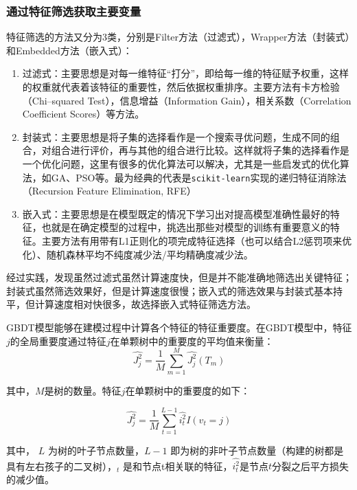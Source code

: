 \documentclass[bwprint]{gmcmthesis}
\begin{document}
\FloatBarrier
\subsubsection{通过特征筛选获取主要变量}\label{sec:feature-selection}

特征筛选的方法又分为3类，分别是Filter方法（过滤式），Wrapper方法（封装式）和Embedded方法（嵌入式）：

\begin{enumerate}
	\item 过滤式：主要思想是对每一维特征“打分”，即给每一维的特征赋予权重，这样的权重就代表着该特征的重要性，然后依据权重排序。主要方法有卡方检验（Chi--squared Test），信息增益（Information Gain），相关系数（Correlation Coefficient Scores）等方法。
	\item 封装式：主要思想是将子集的选择看作是一个搜索寻优问题，生成不同的组合，对组合进行评价，再与其他的组合进行比较。这样就将子集的选择看作是一个优化问题，这里有很多的优化算法可以解决，尤其是一些启发式的优化算法，如GA、PSO等。最为经典的代表是\texttt{scikit-learn}实现的递归特征消除法（Recursion Feature Elimination, RFE）
	\item 嵌入式：主要思想是在模型既定的情况下学习出对提高模型准确性最好的特征，也就是在确定模型的过程中，挑选出那些对模型的训练有重要意义的特征。主要方法有用带有L1正则化的项完成特征选择（也可以结合L2惩罚项来优化）、随机森林平均不纯度减少法/平均精确度减少法。
\end{enumerate}

经过实践，发现虽然过滤式虽然计算速度快，但是并不能准确地筛选出关键特征；封装式虽然筛选效果好，但是计算速度很慢；嵌入式的筛选效果与封装式基本持平，但计算速度相对快很多，故选择嵌入式特征筛选方法。


GBDT模型能够在建模过程中计算各个特征的特征重要度。在GBDT模型中，特征$j$的全局重要度通过特征$j$在单颗树中的重要度的平均值来衡量： 
\begin{equation}\label{eq:gbdt-1}
	\hat{J^2_j} = \frac{1}{M} \sum^M_{m=1}\hat{J^2_j}(T_m)
\end{equation}

其中，$M$是树的数量。特征$j$在单颗树中的重要度的如下：

\begin{equation}\label{eq:gbdt-2}
	\hat{J^2_j} = \frac{1}{M} \sum^{L-1}_{t=1}\hat{i^2_t} I (v_t=j)
\end{equation}

其中， $L$ 为树的叶子节点数量，$L−1$ 即为树的非叶子节点数量（构建的树都是具有左右孩子的二叉树），$_t$ 是和节点t相关联的特征，$\hat{i^2_t}$是节点$t$分裂之后平方损失的减少值。
\end{document}
